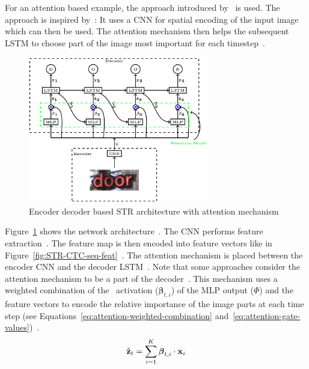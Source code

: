 For an attention based example, the approach introduced by~\cite{ghosh_visual_2017} is used.
The approach is inspired by~\cite{bahdanau_neural_2016,xu_show_2016}: It uses a \ac{CNN} for
spatial encoding of the input image which can then be used.
The attention mechanism then helps the subsequent \ac{LSTM} to choose part of the image most
important for each timestep~\citep{ghosh_visual_2017}.
\begin{figure}[h]
    \centering
    \includegraphics[width=0.7\textwidth]{img/STR-encdec-attention-Gosh-Visual-2017.png}
    \caption[Encoder decoder \& attention based STR architecture]{%
        Encoder decoder based STR architecture with attention
        mechanism~\citep{ghosh_visual_2017}\label{fig:STR-attention}
    }
\end{figure}
Figure~\ref{fig:STR-attention} shows the network architecture~\citep{ghosh_visual_2017}.
The \ac{CNN} performs feature extraction~\citep{ghosh_visual_2017}.
The feature map is then encoded into feature vectors like in
Figure~\ref{fig:STR-CTC-seq-feat}~\citep{ghosh_visual_2017,shi_end--end_2017}.
The attention mechanism is placed between the encoder \ac{CNN} and the decoder
\ac{LSTM}~\citep{ghosh_visual_2017}.
Note that some approaches consider the attention mechanism to be a part of the
decoder~\citep{shi_aster_2019}.
This mechanism uses a weighted combination of the \sfmx\ activation ($\boldsymbol{\beta}_{t,i}$) of
the \ac{MLP} output ($\Phi$) and the feature vectors to encode the relative importance of the
image parts at each time step (see Equations~\ref{eq:attention-weighted-combination}
and~\ref{eq:attention-gate-values})~\citep{ghosh_visual_2017,xu_show_2016}.
\begin{equation}\label{eq:attention-weighted-combination}
    \hat{\textbf{z}}_t=\sum_{i=1}^{K}\boldsymbol{\beta}_{t,i}\cdot \textbf{x}_i
\end{equation}
